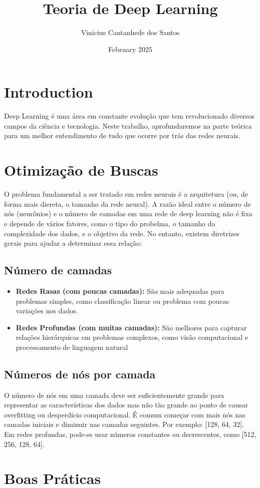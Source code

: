 \documentclass{article}
\title{Teoria de Deep Learning}
\author{Vinicius Cantanhede dos Santos}
\date{February 2025}
\begin{document}
\maketitle

\section{Introduction}
Deep Learning é uma área em constante evolução que tem revolucionado diversos campos da ciência e tecnologia. Neste trabalho, aprofundaremos na parte teórica para um melhor entendimento de tudo que ocorre por trás das redes neurais.
\section{Otimização de Buscas}
O problema fundamental a ser tratado em redes neurais é a arquitetura (ou, de forma mais diereta, o tamanho da rede neural).
A razão ideal entre o número de nós (neurônios) e o número de camadas em uma rede de deep learning não é fixa e depende de vários fatores, como o tipo do probelma, o tamanho da complexidade dos dados, e o objetivo da rede. No entanto, existem diretrizes gerais para ajudar a determinar essa relação:
\subsection{Número de camadas}
\begin{itemize}
    \item \textbf{Redes Rasas (com poucas camadas):} São mais adequadas para problemas simples, como classificação linear ou problema com poucas variações nos dados.
    \item \textbf{Redes Profundas (com muitas camadas):} São melhores para capturar relações hierárquicas em problemas complexos, como visão computacional e processamento de linguagem natural
\end{itemize}
\subsection{Números de nós por camada}
O número de nós em uma camada deve ser suficientemente grande para representar as características dos dados mas não tão grande ao ponto de causar overfitting ou desperdício computacional.
É comum começar com mais nós nas camadas iniciais e diminuir nas camadas seguintes. Por exemplo: [128, 64, 32]. Em redes profundas, pode-se usar números constantes ou decrescentes, como [512, 256, 128, 64].
\section{Boas Práticas}
\end{document}
